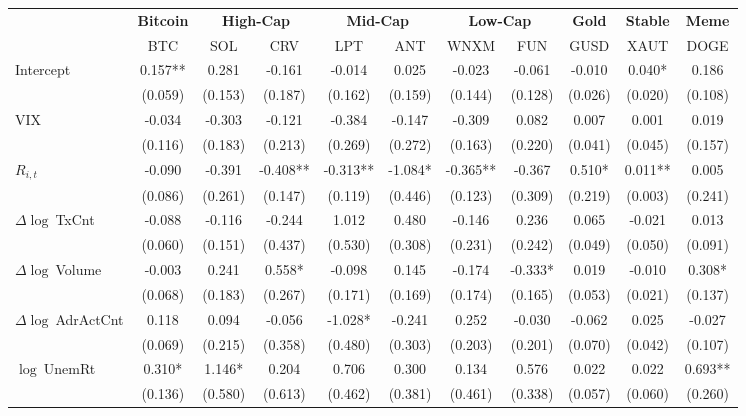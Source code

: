 \begin{table}[ht]
\centering
\scriptsize
\setlength{\tabcolsep}{4pt}
\begin{tabular}{l *{10}{c}}
\toprule
&\multicolumn{1}{c}{\textbf{Bitcoin}}&\multicolumn{2}{c}{\textbf{High-Cap}}&\multicolumn{2}{c}{\textbf{Mid-Cap}}&\multicolumn{2}{c}{\textbf{Low-Cap}}&\multicolumn{1}{c}{\textbf{Gold}}&\multicolumn{1}{c}{\textbf{Stable}}&\multicolumn{1}{c}{\textbf{Meme}}\\
\addlinespace
 & BTC & SOL & CRV & LPT & ANT & WNXM & FUN & GUSD & XAUT & DOGE \\
\midrule
Intercept & 0.157** & 0.281 & -0.161 & -0.014 & 0.025 & -0.023 & -0.061 & -0.010 & 0.040* & 0.186 \\
 & (0.059) & (0.153) & (0.187) & (0.162) & (0.159) & (0.144) & (0.128) & (0.026) & (0.020) & (0.108) \\
\addlinespace
VIX & -0.034 & -0.303 & -0.121 & -0.384 & -0.147 & -0.309 & 0.082 & 0.007 & 0.001 & 0.019 \\
 & (0.116) & (0.183) & (0.213) & (0.269) & (0.272) & (0.163) & (0.220) & (0.041) & (0.045) & (0.157) \\
\addlinespace
$R_{i,t}$ & -0.090 & -0.391 & -0.408** & -0.313** & -1.084* & -0.365** & -0.367 & 0.510* & 0.011** & 0.005 \\
 & (0.086) & (0.261) & (0.147) & (0.119) & (0.446) & (0.123) & (0.309) & (0.219) & (0.003) & (0.241) \\
\addlinespace
$\Delta\log\ $TxCnt & -0.088 & -0.116 & -0.244 & 1.012 & 0.480 & -0.146 & 0.236 & 0.065 & -0.021 & 0.013 \\
 & (0.060) & (0.151) & (0.437) & (0.530) & (0.308) & (0.231) & (0.242) & (0.049) & (0.050) & (0.091) \\
\addlinespace
$\Delta\log\ $Volume & -0.003 & 0.241 & 0.558* & -0.098 & 0.145 & -0.174 & -0.333* & 0.019 & -0.010 & 0.308* \\
 & (0.068) & (0.183) & (0.267) & (0.171) & (0.169) & (0.174) & (0.165) & (0.053) & (0.021) & (0.137) \\
\addlinespace
$\Delta\log\ $AdrActCnt & 0.118 & 0.094 & -0.056 & -1.028* & -0.241 & 0.252 & -0.030 & -0.062 & 0.025 & -0.027 \\
 & (0.069) & (0.215) & (0.358) & (0.480) & (0.303) & (0.203) & (0.201) & (0.070) & (0.042) & (0.107) \\
\addlinespace
$\log\ $UnemRt & 0.310* & 1.146* & 0.204 & 0.706 & 0.300 & 0.134 & 0.576 & 0.022 & 0.022 & 0.693** \\
 & (0.136) & (0.580) & (0.613) & (0.462) & (0.381) & (0.461) & (0.338) & (0.057) & (0.060) & (0.260) \\

\end{tabular}
\end{table}
